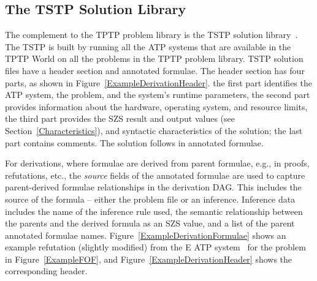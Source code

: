 \documentclass[runningheads]{llncs}
\begin{document}
\subsection{The TSTP Solution Library}
\label{TSTP}

The complement to the TPTP problem library is the TSTP solution library~\cite{Sut07-CSR,Sut10}.
The TSTP is built by running all the ATP systems that are available in the TPTP World on
all the problems in the TPTP problem library.
TSTP solution files have a header section and annotated formulae.
The header section has four parts, as shown in Figure~\ref{ExampleDerivationHeader}.
the first part identifies the ATP system, the problem, and the system's runtime parameters,
the second part provides information about the hardware, operating system, and resource limits,
the third part provides the SZS result and output values (see Section~\ref{Characteristics}), 
and syntactic characteristics of the solution; the last part contains comments.
The solution follows in annotated formulae.

For derivations, where formulae are derived from parent formulae, e.g., in proofs, refutations, 
etc., the {\em source} fields of the annotated formulae are used to capture parent-derived 
formulae relationships in the derivation DAG.
This includes the source of the formula -- either the problem file or an inference.
Inference data includes the name of the inference rule used, the semantic relationship between 
the parents and the derived formula as an SZS value, and a list of the parent annotated formulae 
names.
Figure~\ref{ExampleDerivationFormulae} shows an example refutation (slightly modified) from 
the E ATP system~\cite{SCV19} for the problem in Figure~\ref{ExampleFOF}, and 
Figure~\ref{ExampleDerivationHeader} shows the corresponding header.
\end{document}

